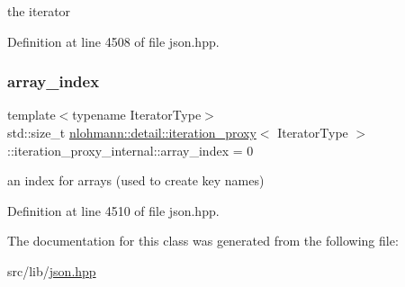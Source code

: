 the iterator 



Definition at line 4508 of file json.\+hpp.

\mbox{\label{classnlohmann_1_1detail_1_1iteration__proxy_1_1iteration__proxy__internal_a3e9a5b1afe857cdf73bc1b31e9746273}} 
\subsubsection{\texorpdfstring{array\+\_\+index}{array\_index}}
{\footnotesize\ttfamily template$<$typename Iterator\+Type$>$ \\
std\+::size\+\_\+t \hyperlink{classnlohmann_1_1detail_1_1iteration__proxy}{nlohmann\+::detail\+::iteration\+\_\+proxy}$<$ Iterator\+Type $>$\+::iteration\+\_\+proxy\+\_\+internal\+::array\+\_\+index = 0\hspace{0.3cm}{\ttfamily [private]}}



an index for arrays (used to create key names) 



Definition at line 4510 of file json.\+hpp.



The documentation for this class was generated from the following file\+:\begin{DoxyCompactItemize}
\item 
src/lib/\hyperlink{json_8hpp}{json.\+hpp}\end{DoxyCompactItemize}
